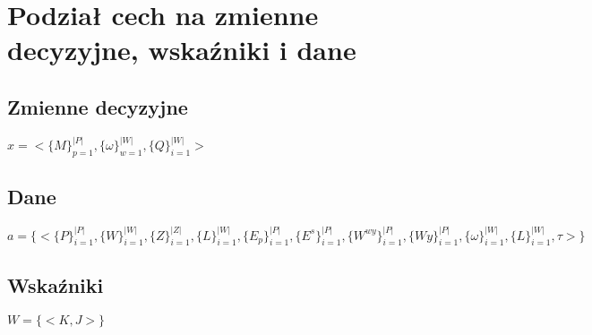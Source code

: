 \documentclass[a4paper,12pt]{extarticle}
\newcommand{\dolGora}[2]{
    _{#1}^{#2}
}
\newcommand{\klamry}[1]{
    \{#1\}
}
\newcommand{\iterate}[1]{
    \klamry{#1}\dolGora{i=1}{|#1|}
}
\newcommand{\iterateParam}[2]{
    \klamry{#1}\dolGora{i=1}{|#2|}
}
\begin{document}
\newpage
\section{Podział cech na zmienne decyzyjne, wskaźniki i dane}
    \subsection{Zmienne decyzyjne}
    $x = < \klamry{M}\dolGora{p=1}{|P|},\klamry{\omega}\dolGora{w=1}{|W|},\iterateParam{Q}{W}>$
    
    \subsection{Dane}
    $a = \{<\iterate{P},\iterate{W},\iterate{Z},\iterateParam{L}{W},\iterateParam{E_p}{P},\iterateParam{E^s}{P},\iterateParam{W^{wy}}{P},\iterateParam{Wy}{P},\iterateParam{\omega}{W},\iterateParam{L}{W},\tau>\}$
    
    \subsection{Wskaźniki}
    $W = \{<K,J>\}$
\end{document}
